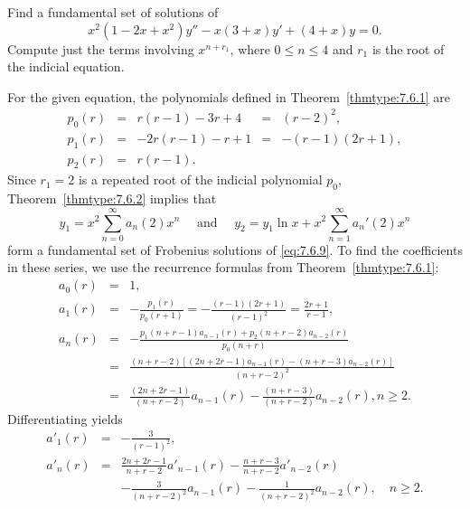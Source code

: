 \documentclass{ximera}
\begin{document}
\begin{example}\label{example:7.6.1}
Find  a fundamental set of solutions of
\begin{equation} \label{eq:7.6.9}
x^2(1-2x+x^2)y''-x(3+x)y'+(4+x)y=0.
\end{equation}
Compute just the terms involving $x^{n+r_1}$, where  $0\leq n\leq 4$
and $r_1$ is the root of the indicial equation.


\begin{explanation}
For the given equation,  the polynomials defined in
Theorem~\ref{thmtype:7.6.1} are
$$
\begin{array}{lllll}
p_0(r)&=&r(r-1)-3r+4&=&(r-2)^2,\\
p_1(r)&=&-2r(r-1)-r+1&=&-(r-1)(2r+1),\\
p_2(r)&=&r(r-1).
\end{array}
$$
Since $r_1=2$ is a repeated root of the indicial polynomial $p_0$,
Theorem~\ref{thmtype:7.6.2} implies that
\begin{equation} \label{eq:7.6.10}
y_1=x^2\sum_{n=0}^\infty  a_n(2)x^n\quad\mbox{ and }\quad
y_2=y_1\ln x+x^2\sum_{n=1}^\infty a_n'(2)x^n
\end{equation}
form a fundamental set of  Frobenius solutions of \eqref{eq:7.6.9}.
To find the coefficients in these series, we use the recurrence
formulas from Theorem~\ref{thmtype:7.6.1}:
\begin{equation} \label{eq:7.6.11}
\begin{array}{ccl}
a_0(r)&=&1,\\
a_1(r)&=&-\frac{p_1(r)}{p_0(r+1)}
=-\frac{(r-1)(2r+1)}{(r-1)^2}
=\frac{2r+1}{r-1},\\
a_n(r)&=&-\frac{p_1(n+r-1)a_{n-1}(r)+p_2(n+r-2)a_{n-2}(r)}{p_0(n+r)}\\
&=&\frac{(n+r-2)\left[(2n+2r-1)a_{n-1}(r)
-(n+r-3)a_{n-2}(r)\right]}{(n+r-2)^2}\\
&=&\frac{(2n+2r-1)}{(n+r-2)}a_{n-1}(r)-
\frac{(n+r-3)}{(n+r-2)}a_{n-2}(r),n\geq 2.
\end{array}
\end{equation}
Differentiating yields
\begin{equation} \label{eq:7.6.12}
\begin{array}{ccl}
a'_1(r)&=&-\frac{3}{(r-1)^2},\\
a'_n(r)&=&\frac{2n+2r-1}{n+r-2}a'_{n-1}(r)-\frac{n+r-3}{n+r-2}a'_{n-2}(r)\\
&&-\frac{3}{(n+r-2)^2}a_{n-1}(r)-\frac{1}{(n+r-2)^2}a_{n-2}(r),\quad
n\geq 2.
\end{array}
\end{equation}


\end{explanation}
\end{example}
\end{document}
